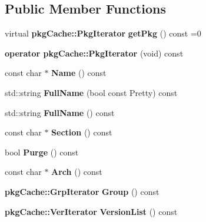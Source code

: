 \subsection*{\-Public \-Member \-Functions}
\begin{DoxyCompactItemize}
\item 
virtual {\bf pkg\-Cache\-::\-Pkg\-Iterator} {\bfseries get\-Pkg} () const =0\label{classAPT_1_1PackageContainerInterface_1_1const__iterator_afa7e5bc2e09a32814c9dc2b9d9a744d0}

\item 
{\bfseries operator pkg\-Cache\-::\-Pkg\-Iterator} (void) const \label{classAPT_1_1PackageContainerInterface_1_1const__iterator_adbd53fd83c778a05b1390d804727f431}

\item 
const char $\ast$ {\bfseries \-Name} () const \label{classAPT_1_1PackageContainerInterface_1_1const__iterator_a6f8ea4f3037e8339cbd3e55d97ed08a9}

\item 
std\-::string {\bfseries \-Full\-Name} (bool const \-Pretty) const \label{classAPT_1_1PackageContainerInterface_1_1const__iterator_a22bb6a070d87c6c70078d866aa12fa4f}

\item 
std\-::string {\bfseries \-Full\-Name} () const \label{classAPT_1_1PackageContainerInterface_1_1const__iterator_a5fa70ad3c8f7aebe94d7b253322edfb3}

\item 
const char $\ast$ {\bfseries \-Section} () const \label{classAPT_1_1PackageContainerInterface_1_1const__iterator_a699ec4acd1a98b86dde5a40fe34e3e5f}

\item 
bool {\bfseries \-Purge} () const \label{classAPT_1_1PackageContainerInterface_1_1const__iterator_a361e8407fcd6ef049bcd3d5838d0b65f}

\item 
const char $\ast$ {\bfseries \-Arch} () const \label{classAPT_1_1PackageContainerInterface_1_1const__iterator_a4e69d1500284f055bd4802e6e309c47d}

\item 
{\bf pkg\-Cache\-::\-Grp\-Iterator} {\bfseries \-Group} () const \label{classAPT_1_1PackageContainerInterface_1_1const__iterator_a03f4146a04ef486485197bfc6a57cdc7}

\item 
{\bf pkg\-Cache\-::\-Ver\-Iterator} {\bfseries \-Version\-List} () const \label{classAPT_1_1PackageContainerInterface_1_1const__iterator_aa79c99bc0ff9bcd31500548a1fb69171}


\end{DoxyCompactItemize}

